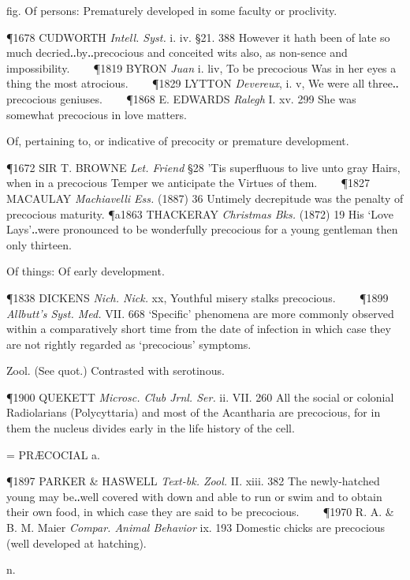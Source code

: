 \begin{description}[wide, labelwidth=!, labelindent=0pt]
\begin{myenumerate}
 fig. Of persons: Prematurely developed in some faculty or proclivity.

\P 1678 CUDWORTH  \textit{Intell. Syst.} i. iv. §21. 388 However it hath been of late so much decried‥by‥precocious and conceited wits also, as non-sence and impossibility.    
\P 1819 BYRON  \textit{Juan} i. liv, To be precocious Was in her eyes a thing the most atrocious.    
\P 1829 LYTTON  \textit{Devereux}, i. v, We were all three‥precocious geniuses.    
\P 1868 E. EDWARDS  \textit{Ralegh} I. xv. 299 She was somewhat precocious in love matters.

 Of, pertaining to, or indicative of precocity or premature development.

\P 1672 SIR T. BROWNE  \textit{Let. Friend} §28 'Tis superfluous to live unto gray Hairs, when in a precocious Temper we anticipate the Virtues of them.    
\P 1827 MACAULAY  \textit{Machiavelli Ess.} (1887) 36 Untimely decrepitude was the penalty of precocious maturity.
\P a1863 THACKERAY  \textit{Christmas Bks.} (1872) 19 His ‘Love Lays’‥were pronounced to be wonderfully precocious for a young gentleman then only thirteen.

 Of things: Of early development.

\P 1838 DICKENS  \textit{Nich. Nick.} xx, Youthful misery stalks precocious.    
\P 1899 \textit{Allbutt's  Syst. Med.} VII. 668 ‘Specific’ phenomena are more commonly observed within a comparatively short time from the date of infection in which case they are not rightly regarded as ‘precocious’ symptoms.

 Zool. (See quot.) Contrasted with serotinous.

\P 1900 QUEKETT  \textit{Microsc. Club Jrnl. Ser.} ii. VII. 260 All the social or colonial Radiolarians (Polycyttaria) and most of the Acantharia are precocious, for in them the nucleus divides early in the life history of the cell.

 = PRÆCOCIAL a.

\P 1897 PARKER \& HASWELL  \textit{Text-bk. Zool.} II. xiii. 382 The newly-hatched young may be‥well covered with down and able to run or swim and to obtain their own food, in which case they are said to be precocious.    
\P 1970 R. A. \&  B. M. Maier \textit{Compar. Animal Behavior} ix. 193 Domestic chicks are precocious (well developed at hatching).
\end{myenumerate}

 n.


\end{description}
